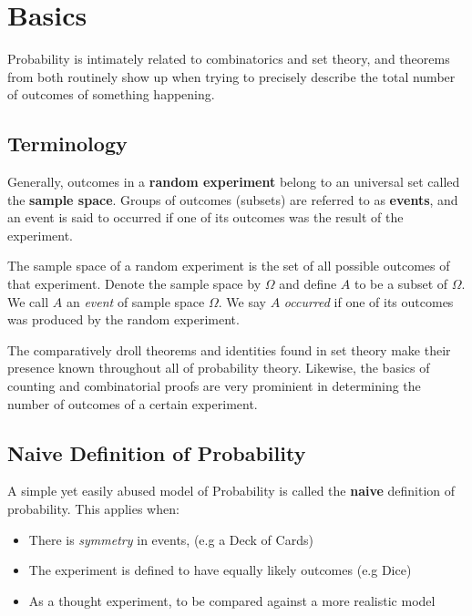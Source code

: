 \documentclass{standalone}
\begin{document}
\section{Basics}

Probability is intimately related to combinatorics and set theory, and theorems
from both routinely show up when trying to precisely describe the total number
of outcomes of something happening.

\subsection{Terminology}

Generally, outcomes in a \textbf{random experiment} belong to an universal set
called the \textbf{sample space}. Groups of outcomes (subsets) are referred to
as \textbf{events}, and an event is said to occurred if one of its outcomes was
the result of the experiment.

\begin{definition} \label{def:samplespace}
  The sample space of a random experiment is the set of all possible outcomes
  of that experiment. Denote the sample space by $\Omega$ and define $A$ to be
  a subset of $\Omega$. We call $A$ an \emph{event} of sample space $\Omega$.
  We say $A$ \emph{occurred} if one of its outcomes was produced by the random
  experiment.
\end{definition}

The comparatively droll theorems and identities found in set theory make their
presence known throughout all of probability theory. Likewise, the basics of
counting and combinatorial proofs are very prominient in determining the number
of outcomes of a certain experiment.

\subsection{Naive Definition of Probability}

A simple yet easily abused model of Probability is called the \textbf{naive}
definition of probability. This applies when:

\begin{itemize}
  \item There is \emph{symmetry} in events, (e.g a Deck of Cards)
  \item The experiment is defined to have equally likely outcomes (e.g Dice)
  \item As a thought experiment, to be compared against a more realistic model
\end{itemize}
\end{document}
